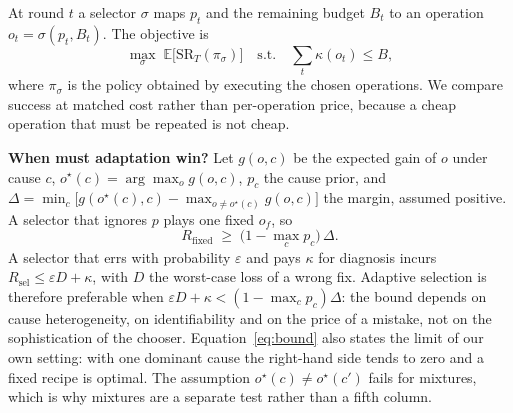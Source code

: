 \documentclass[conference]{IEEEtran}
\begin{document}
At round $t$ a selector $\sigma$ maps $p_t$ and the remaining budget $B_t$ to an operation $o_t=\sigma(p_t,B_t)$. The objective is
\begin{equation}
\max_{\sigma}\;\mathbb{E}\big[\mathrm{SR}_T(\pi_{\sigma})\big]\quad\text{s.t.}\quad \textstyle\sum_{t}\kappa(o_t)\le B ,
\label{eq:obj}
\end{equation}
where $\pi_\sigma$ is the policy obtained by executing the chosen operations. We compare success at matched cost rather than per-operation price, because a cheap operation that must be repeated is not cheap.

\textbf{When must adaptation win?} Let $g(o,c)$ be the expected gain of $o$ under cause $c$, $o^\star(c)=\arg\max_o g(o,c)$, $p_c$ the cause prior, and
$\Delta=\min_{c}\big[g(o^\star(c),c)-\max_{o\ne o^\star(c)}g(o,c)\big]$
the margin, assumed positive. A selector that ignores $p$ plays one fixed $o_f$, so
\begin{equation}
R_{\text{fixed}}\;\ge\;\big(1-\max_c p_c\big)\,\Delta .
\label{eq:bound}
\end{equation}
A selector that errs with probability $\varepsilon$ and pays $\kappa$ for diagnosis incurs $R_{\text{sel}}\le \varepsilon D+\kappa$, with $D$ the worst-case loss of a wrong fix. Adaptive selection is therefore preferable when $\varepsilon D+\kappa<(1-\max_c p_c)\Delta$: the bound depends on cause heterogeneity, on identifiability and on the price of a mistake, not on the sophistication of the chooser. Equation~\eqref{eq:bound} also states the limit of our own setting: with one dominant cause the right-hand side tends to zero and a fixed recipe is optimal. The assumption $o^\star(c)\ne o^\star(c')$ fails for mixtures, which is why mixtures are a separate test rather than a fifth column.
\end{document}
